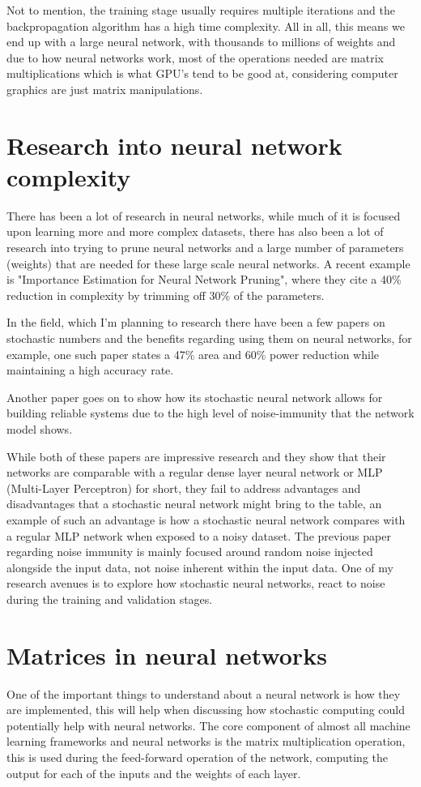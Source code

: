 \documentclass[a4paper,oneside,phd,etd]{BYUPhys}
\begin{document}
Not to mention, the training stage usually requires multiple iterations and the backpropagation algorithm has a high time complexity\cite{backprop-time-complexity}. All in all, this means we end up with a large neural network, with thousands to millions of weights and due to how neural networks work, most of the operations needed are matrix multiplications which is what GPU's tend to be good at, considering computer graphics are just matrix manipulations.

\section{Research into neural network complexity}
There has been a lot of research in neural networks, while much of it is focused upon learning more and more complex datasets\cite{research-1}\cite{research-2}\cite{research-3}, there has also been a lot of research into trying to prune neural networks and a large number of parameters (weights) that are needed for these large scale neural networks. A recent example is "Importance Estimation for Neural Network Pruning"\cite{molchanov2019taylor}, where they cite a 40\% reduction in complexity by trimming off 30\% of the parameters.

In the field, which I'm planning to research there have been a few papers on stochastic numbers and the benefits regarding using them on neural networks, for example, one such paper states a 47\% area and 60\% power reduction while maintaining a high accuracy rate\cite{8119196}. 

Another paper\cite{7093194} goes on to show how its stochastic neural network allows for building reliable systems due to the high level of noise-immunity that the network model shows.

While both of these papers are impressive research and they show that their networks are comparable with a regular dense layer neural network or MLP (Multi-Layer Perceptron) for short, they fail to address advantages and disadvantages that a stochastic neural network might bring to the table, an example of such an advantage is how a stochastic neural network compares with a regular MLP network when exposed to a noisy dataset. The previous paper regarding noise immunity is mainly focused around random noise injected alongside the input data, not noise inherent within the input data. One of my research avenues is to explore how stochastic neural networks, react to noise during the training and validation stages.

\section{Matrices in neural networks}
One of the important things to understand about a neural network is how they are implemented, this will help when discussing how stochastic computing could potentially help with neural networks. The core component of almost all machine learning frameworks and neural networks is the matrix multiplication operation, this is used during the feed-forward operation of the network, computing the output for each of the inputs and the weights of each layer.
\end{document}

